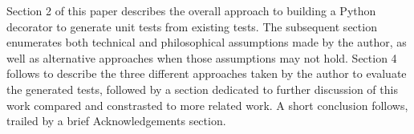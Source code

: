 Section 2 of this paper describes the overall approach to building a
Python decorator to generate unit tests from existing tests. The subsequent
section enumerates both technical and philosophical assumptions made by the
author, as well as alternative approaches when those assumptions may not hold.
Section 4 follows to describe the three different approaches taken by the author to 
evaluate the generated tests, followed by a section dedicated to further 
discussion of this work compared and constrasted to more related work.  A short
conclusion follows, trailed by a brief Acknowledgements section.

